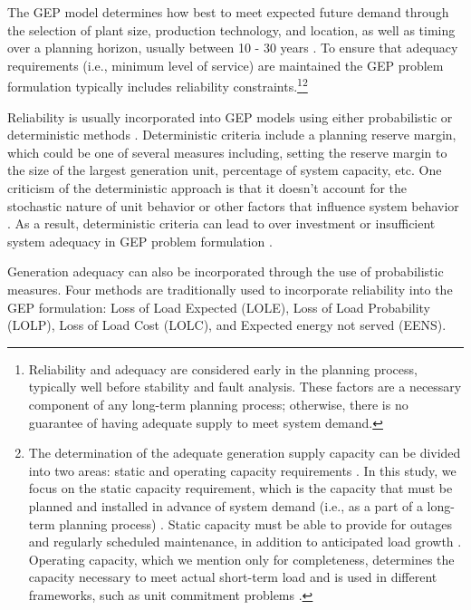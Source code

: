\documentclass[10pt]{amsart}
\begin{document}
The GEP model determines how best to meet expected future demand through the selection of plant size, production technology, and location, as well as timing over a planning horizon, usually between 10 - 30 years \parencite{hemmati:2013ab}. 
To ensure that adequacy requirements (i.e., minimum level of service) are maintained the GEP problem formulation typically includes reliability constraints.\footnote{Reliability and adequacy are considered early in the planning process, typically well before stability and fault analysis. These factors are a necessary component of any long-term planning process; otherwise, there is no guarantee of having adequate supply to meet system demand.}\footnote{The determination of the adequate generation supply capacity can be divided into two areas: static and operating capacity requirements \parencite{billinton1984reliability}.
In this study, we focus on the static capacity requirement, which is the capacity that must be planned and installed in advance of system demand (i.e., as a part of a long-term planning process) \parencite{billinton1984reliability}.
Static capacity must be able to provide for outages and regularly scheduled maintenance, in addition to anticipated load growth \parencite{billinton1984reliability}.
Operating capacity, which we mention only for completeness, determines the capacity necessary to meet actual short-term load and is used in different frameworks, such as unit commitment problems \parencite{billinton1984reliability}.}
	 
Reliability is usually incorporated into GEP models using either probabilistic or deterministic methods \parencite{aghaei:2013aa}. 
Deterministic criteria include a planning reserve margin, which could be one of several measures including, setting the reserve margin to the size of the largest generation unit, percentage of system capacity, etc. 
One criticism of the deterministic approach is that it doesn't account for the stochastic nature of unit behavior or other factors that influence system behavior \parencite{aghaei:2013aa}.
As a result, deterministic criteria can lead to over investment or insufficient system adequacy in GEP problem formulation \parencite{aghaei:2013aa}.  
	
Generation adequacy can also be incorporated through the use of probabilistic measures. 
Four methods are traditionally used to incorporate reliability into the GEP formulation: Loss of Load Expected (LOLE), Loss of Load Probability (LOLP), Loss of Load Cost (LOLC), and Expected energy not served (EENS).
	
\end{document}
